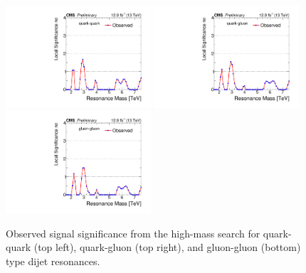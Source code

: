 \begin{figure}[hbtp]
  \centering
    \includegraphics[width=0.48\textwidth]{figs/dijet/signif_qq_pfdijet2016.pdf}
    \includegraphics[width=0.48\textwidth]{figs/dijet/signif_qg_pfdijet2016.pdf}
    \includegraphics[width=0.48\textwidth]{figs/dijet/signif_gg_pfdijet2016.pdf}
    \caption{Observed signal significance from the high-mass search for
      quark-quark (top left), quark-gluon (top right), and gluon-gluon
      (bottom) type dijet resonances.}
    \label{figSignifHigh}
\end{figure}


